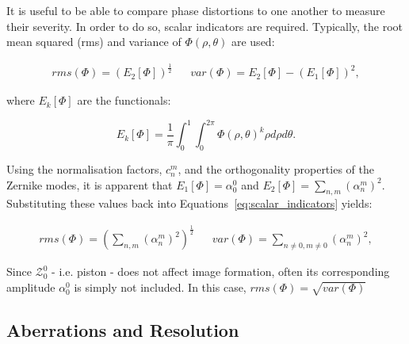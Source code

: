 It is useful to be able to compare phase distortions to one another to
measure their severity. In order to do so, scalar indicators are required.
Typically, the root mean squared (rms) and variance of $\Phi\left(\rho,\theta\right)$
are used:

\begin{align}\label{eq:scalar_indicators}
rms(\Phi) = \left(E_{2}\left[\Phi\right]\right)^{\frac{1}{2}} && 
var(\Phi) = E_{2}\left[\Phi\right] - \left(E_{1}\left[\Phi\right]\right)^{2},
\end{align}

where $E_{k}\left[\Phi\right]$ are the 
functionals\cite{antonello2014optimisation,mahajan1994zernike}:

\begin{equation}\label{eq:E_functionals}
E_{k}\left[\Phi\right] = \frac{1}{\pi} \int_{0}^{1}\int_{0}^{2\pi} \Phi\left(\rho,\theta\right)^{k}\rho d\rho d\theta.
\end{equation}

Using the normalisation factors, $c_{n}^{m}$, and the orthogonality
properties of the Zernike modes, it is apparent that $E_{1}\left[\Phi\right] 
= \alpha_{0}^{0}$ and $E_{2}\left[\Phi\right] = 
\sum\limits_{n,m}{\left({\alpha_{n}^{m}}\right)^{2}}$. Substituting 
these values back into Equations~\ref{eq:scalar_indicators} yields:

\begin{align}\label{eq:scalar_indicators_new}
rms(\Phi) = \left(\sum\limits_{n,m}{\left({\alpha_{n}^{m}}\right)^{2}}\right)^{\frac{1}{2}} && 
var(\Phi) = \sum\limits_{n\ne 0,m\ne 0}{\left({\alpha_{n}^{m}}\right)^{2}},
\end{align}

Since $\mathcal{Z}_{0}^{0}$ - i.e. piston - does not affect image 
formation, often its corresponding amplitude $\alpha_{0}^{0}$ is
simply not included. In this case, $rms(\Phi) = \sqrt{var(\Phi)}$

\subsection{Aberrations and Resolution}
\label{subsec:aberrations_and_resolution}

